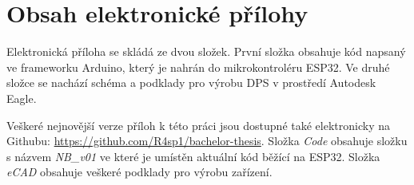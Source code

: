 \chapter{Obsah elektronické přílohy}

\par Elektronická příloha se skládá ze dvou složek. První složka obsahuje kód napsaný ve frameworku Arduino, který je nahrán do mikrokontroléru ESP32. Ve druhé složce se nachází schéma a podklady pro výrobu DPS v prostředí Autodesk Eagle.

\par Veškeré nejnovější verze příloh k této práci jsou dostupné také elektronicky na Githubu: \url{https://github.com/R4sp1/bachelor-thesis}. Složka \emph{Code} obsahuje složku s názvem \emph{NB\_v01} ve které je umístěn aktuální kód běžící na ESP32. Složka \emph{eCAD} obsahuje veškeré podklady pro výrobu zařízení.


